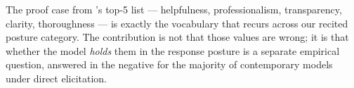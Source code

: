 The proof case from \citet{huang2025values}'s top-5 list --- helpfulness, professionalism, transparency, clarity, thoroughness --- is exactly the vocabulary that recurs across our recited posture category. The contribution is not that those values are wrong; it is that whether the model \emph{holds} them in the response posture is a separate empirical question, answered in the negative for the majority of contemporary models under direct elicitation.

